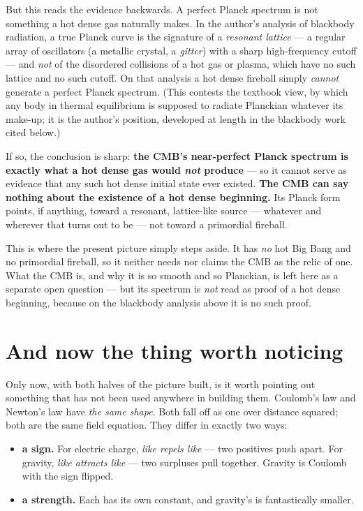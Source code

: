\documentclass[11pt]{article}
\begin{document}
But this reads the evidence backwards. A perfect Planck spectrum is not something a hot dense gas naturally makes.
In the author's analysis of blackbody radiation, a true Planck curve is the signature of a \emph{resonant lattice}
--- a regular array of oscillators (a metallic crystal, a \emph{gitter}) with a sharp high-frequency cutoff --- and
\emph{not} of the disordered collisions of a hot gas or plasma, which have no such lattice and no such cutoff. On
that analysis a hot dense fireball simply \emph{cannot} generate a perfect Planck spectrum. (This contests the
textbook view, by which any body in thermal equilibrium is supposed to radiate Planckian whatever its make-up; it
is the author's position, developed at length in the blackbody work cited below.)

If so, the conclusion is sharp: \textbf{the CMB's near-perfect Planck spectrum is exactly what a hot dense gas would
\emph{not} produce} --- so it cannot serve as evidence that any such hot dense initial state ever existed.
\textbf{The CMB can say nothing about the existence of a hot dense beginning.} Its Planck form points, if anything,
toward a resonant, lattice-like source --- whatever and wherever that turns out to be --- not toward a primordial
fireball.

This is where the present picture simply steps aside. It has \emph{no} hot Big Bang and no primordial fireball, so
it neither needs nor claims the CMB as the relic of one. What the CMB is, and why it is so smooth and so Planckian,
is left here as a separate open question --- but its spectrum is \emph{not} read as proof of a hot dense
beginning, because on the blackbody analysis above it is no such proof.

\section*{And now the thing worth noticing}
Only now, with both halves of the picture built, is it worth pointing out something that has not been used
anywhere in building them. Coulomb's law and Newton's law have \emph{the same shape}. Both fall off as one over
distance squared; both are the same field equation. They differ in exactly two ways:

\begin{itemize}
\item \textbf{a sign.} For electric charge, \emph{like repels like} --- two positives push apart. For gravity,
\emph{like attracts like} --- two surpluses pull together. Gravity is Coulomb with the sign flipped.
\item \textbf{a strength.} Each has its own constant, and gravity's is fantastically smaller.
\end{itemize}
\end{document}
